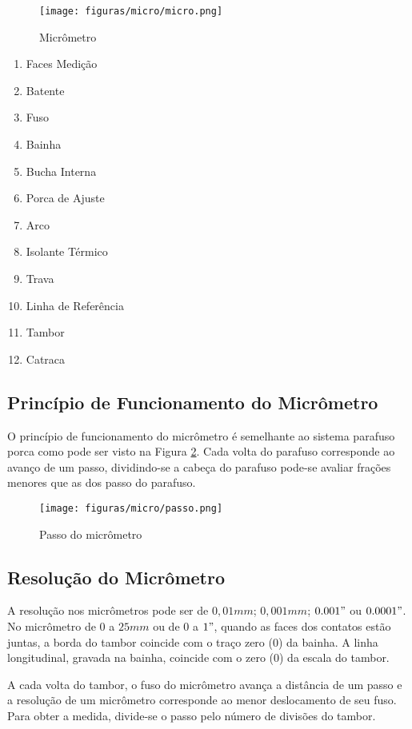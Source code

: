 \documentclass[10pt,a4paper,onecolumn,notitlepage]{scrartcl}
\begin{document}
\begin{figure}[ht]
\centering
\texttt{[image: figuras/micro/micro.png]} 
\caption{Micrômetro}
\label{fig:micro}
\end{figure}

\begin{multicols}{2}
\begin{enumerate}
\item Faces Medição
\item Batente
\item Fuso
\item Bainha
\item Bucha Interna
\item Porca de Ajuste
\item Arco
\item Isolante Térmico
\item Trava
\item Linha de Referência
\item Tambor
\item Catraca
\end{enumerate}
\end{multicols}

\subsection{Princípio de Funcionamento do Micrômetro}
O princípio de funcionamento do micrômetro é semelhante ao sistema parafuso porca como pode ser visto na Figura \ref{fig:passo}. Cada volta do parafuso corresponde ao avanço de um passo, dividindo-se a cabeça do parafuso pode-se avaliar frações menores que as dos passo do parafuso.

\begin{figure}[H]
\centering
\texttt{[image: figuras/micro/passo.png]} 
\caption{Passo do micrômetro}
\label{fig:passo}
\end{figure}

\subsection{Resolução do Micrômetro}
A resolução nos micrômetros pode ser de $0,01mm$; $0,001mm$; $0.001"$ ou $0.0001"$. No micrômetro de $0$ a $25mm$ ou de $0$ a $1"$, quando as faces dos contatos estão juntas, a borda do tambor coincide com o traço zero (0) da bainha. A linha longitudinal, gravada na bainha, coincide com o zero (0) da escala do tambor.

A cada volta do tambor, o fuso do micrômetro avança a distância de um passo e a resolução de um micrômetro corresponde ao menor deslocamento de seu fuso. Para obter a medida, divide-se o passo pelo número de divisões do tambor.
\end{document}
